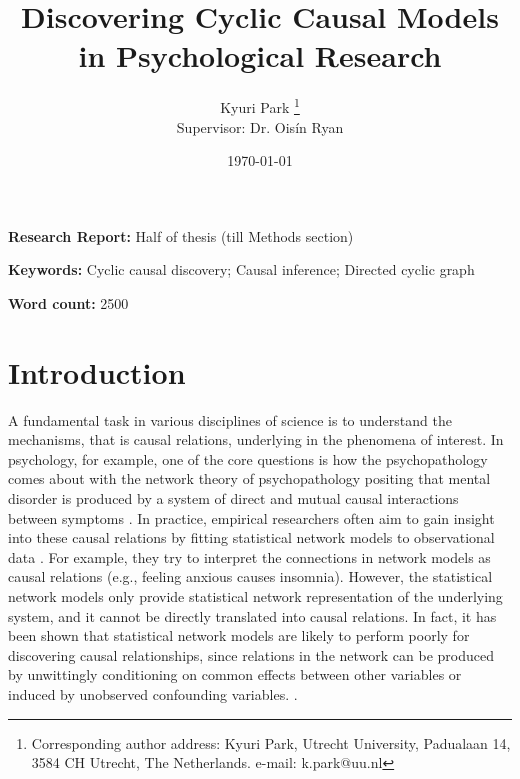\documentclass[11pt]{article}
\title{Discovering Cyclic Causal Models in Psychological Research 
}
\author[1]{\Large{Kyuri Park \thanks{Corresponding author address: Kyuri Park, Utrecht University, Padualaan 14, 3584 CH Utrecht, The Netherlands. e-mail: k.park@uu.nl}}\\
\large{Supervisor: Dr. Ois\'{i}n Ryan}}
\affil[1]{Department of Methodology and Statistics, Utrecht University}
\date{\today}
\theoremstyle{definition}
\begin{document}
{
\maketitle

\noindent\textbf{Research Report: }%
Half of thesis (till Methods section)


\noindent\textbf{Keywords: }%
Cyclic causal discovery; Causal inference; Directed cyclic graph} 


\noindent\textbf{Word count: }%
2500
\\


\section{Introduction}
A fundamental task in various disciplines of science is to understand the mechanisms, that is causal relations, underlying in the phenomena of interest. In psychology, for example, one of the core questions is how the psychopathology comes about with the network theory of psychopathology positing that mental disorder is produced by a system of direct and mutual causal interactions between symptoms \citep{BorsboomCramer2013}. In practice, empirical researchers often aim to gain insight into these causal relations by fitting statistical network models to observational data \citep{robinaugh2020}. For example, they try to interpret the connections in network models as causal relations (e.g., feeling anxious causes insomnia). However, the statistical network models only provide statistical network representation of the underlying system, and it cannot be directly translated into causal relations. In fact, it has been shown that statistical network models are likely to perform poorly for discovering causal relationships, since relations in the network can be produced by unwittingly conditioning on common effects between other variables or induced by unobserved confounding variables. \citep{Ryan2022}.
\end{document}
